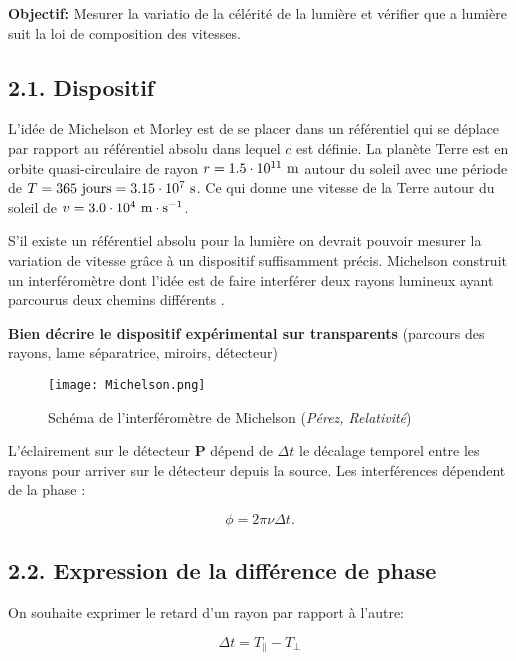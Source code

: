 \documentclass[french, a4paper, 10pt, twocolumn, landscape]{article}
\begin{document}
\textbf{Objectif:} Mesurer la variatio de la célérité de la lumière et vérifier que a lumière suit la loi de composition des vitesses.

\subsection*{2.1. Dispositif}

L'idée de Michelson et Morley est de se placer dans un référentiel qui se déplace par rapport au référentiel absolu dans lequel $c$ est définie. La planète Terre est en orbite quasi-circulaire de rayon $r=1.5\cdot 10^{11}~\rm m$ autour du soleil avec une période de $T = 365~\text{jours} = 3.15\cdot 10^{7}~ \rm s$. Ce qui donne une vitesse de la Terre autour du soleil de $v=3.0\cdot 10^4~\rm m\cdot s^{-1}$.

S'il existe un référentiel absolu pour la lumière on devrait pouvoir mesurer la variation de vitesse grâce à un dispositif suffisamment précis. Michelson construit un interféromètre dont l'idée est de faire interférer deux rayons lumineux ayant parcourus deux chemins différents .

\begin{center}
	\textbf{Bien décrire le dispositif expérimental sur transparents} (parcours des rayons, lame séparatrice, miroirs, détecteur)
\end{center}

\begin{figure}[ht]
 	\centering
 	\texttt{[image: Michelson.png]}
	\caption{Schéma de l'interféromètre de Michelson (\textit{Pérez, Relativité})}
 \end{figure}

L'éclairement sur le détecteur \textbf{P} dépend de $\Delta t$ le décalage temporel entre les rayons pour arriver sur le détecteur depuis la source. Les interférences dépendent de la phase : 

\begin{equation}
	\phi = 2\pi\nu\Delta t.
\end{equation}

\subsection*{2.2. Expression de la différence de phase}

On souhaite exprimer le retard d'un rayon par rapport à l'autre:

\begin{equation}
	\Delta t = T_{\parallel}-T_{\perp}
\end{equation}
\end{document}
